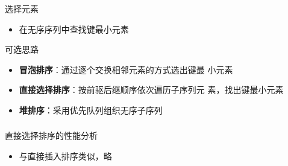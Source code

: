 \begin{frame}
    \frametitle{\insertsectionhead}
    \begin{block}{选择元素}
        \begin{itemize}
            \item 在\alert{无序序列}中\alert{查找}键最小元素
        \end{itemize}
    \end{block}
    \begin{block}{可选思路}
        \begin{itemize}
            \item \textbf{冒泡排序}：通过逐个交换相邻元素的方式\alert{选出}键最
                  小元素
            \item \textbf{直接选择排序}：按前驱后继顺序依次遍历子序列元
                  素，\alert{找出}键最小元素
            \item \textbf{堆排序}：采用\alert{优先队列}组织无序子序列
        \end{itemize}
    \end{block}
\end{frame}

\begin{frame}
    \frametitle{\insertsectionhead}
    \begin{block}{直接选择排序的性能分析}
        \begin{itemize}
            \item 与直接插入排序类似，略
        \end{itemize}
    \end{block}
\end{frame}

